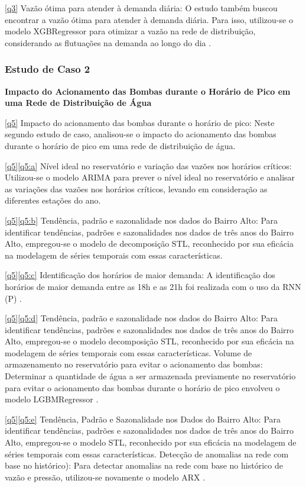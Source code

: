 \eqref{q3} Vazão ótima para atender à demanda diária: O estudo também buscou encontrar a vazão ótima para atender à demanda diária. Para isso, utilizou-se o modelo XGBRegressor  para otimizar a vazão na rede de distribuição, considerando as flutuações na demanda ao longo do dia \cite{2-s2.0-85130441623}.

\subsubsection{Estudo de Caso 2}

\noindent\textbf{Impacto do Acionamento das Bombas durante o Horário de Pico em uma Rede de Distribuição de Água}

\eqref{q5} Impacto do acionamento das bombas durante o horário de pico: Neste segundo estudo de caso, analisou-se o impacto do acionamento das bombas durante o horário de pico em uma rede de distribuição de água.

\ref{q5}\eqref{q5:a} Nível ideal no reservatório e variação das vazões nos horários críticos: Utilizou-se o modelo ARIMA  \cite{2-s2.0-85069459067} para prever o nível ideal no reservatório e analisar as variações das vazões nos horários críticos, levando em consideração as diferentes estações do ano.

\ref{q5}\eqref{q5:b} Tendência, padrão e sazonalidade nos dados do Bairro Alto: Para identificar tendências, padrões e sazonalidades nos dados de três anos do Bairro Alto, empregou-se o modelo de decomposição STL, reconhecido por sua eficácia na modelagem de séries temporais com essas características.

\ref{q5}\eqref{q5:c} Identificação dos horários de maior demanda: A identificação dos horários de maior demanda entre as 18h e as 21h foi realizada com o uso da RNN (P) \cite{2-s2.0-85067419084}.

\ref{q5}\eqref{q5:d} Tendência, padrão e sazonalidade nos dados do Bairro Alto: Para identificar tendências, padrões e sazonalidades nos dados de três anos do Bairro Alto, empregou-se o modelo decomposição STL, reconhecido por sua eficácia na modelagem de séries temporais com essas características. Volume de armazenamento no reservatório para evitar o acionamento das bombas: Determinar a quantidade de água a ser armazenada previamente no reservatório para evitar o acionamento das bombas durante o horário de pico envolveu o modelo LGBMRegressor .

\ref{q5}\eqref{q5:e} Tendência, Padrão e Sazonalidade nos Dados do Bairro Alto: Para identificar tendências, padrões e sazonalidades nos dados de três anos do Bairro Alto, empregou-se o modelo STL, reconhecido por sua eficácia na modelagem de séries temporais com essas características. Detecção de anomalias na rede com base no histórico): Para detectar anomalias na rede com base no histórico de vazão e pressão, utilizou-se novamente o modelo ARX \cite{2-s2.0-85051469381}.











